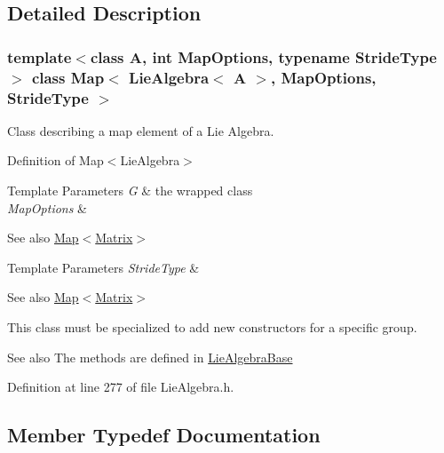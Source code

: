 \subsection{Detailed Description}
\subsubsection*{template$<$class A, int Map\+Options, typename Stride\+Type$>$\newline
class Map$<$ Lie\+Algebra$<$ A $>$, Map\+Options, Stride\+Type $>$}

Class describing a map element of a Lie Algebra. 

Definition of Map$<$\+Lie\+Algebra$>$


\begin{DoxyTemplParams}{Template Parameters}
{\em G} & the wrapped class \\
\hline
{\em Map\+Options} & \\
\hline
\end{DoxyTemplParams}
\begin{DoxySeeAlso}{See also}
\hyperlink{class_map_3_01_lie_algebra_3_01_a_01_4_00_01_map_options_00_01_stride_type_01_4_a5e320dd14d4d47929d7a4d48014a735f}{Map$<$\+Matrix$>$} 
\end{DoxySeeAlso}

\begin{DoxyTemplParams}{Template Parameters}
{\em Stride\+Type} & \\
\hline
\end{DoxyTemplParams}
\begin{DoxySeeAlso}{See also}
\hyperlink{class_map_3_01_lie_algebra_3_01_a_01_4_00_01_map_options_00_01_stride_type_01_4_a5e320dd14d4d47929d7a4d48014a735f}{Map$<$\+Matrix$>$}
\end{DoxySeeAlso}
This class must be specialized to add new constructors for a specific group.

\begin{DoxySeeAlso}{See also}
The methods are defined in \hyperlink{class_lie_algebra_base}{Lie\+Algebra\+Base} 
\end{DoxySeeAlso}


Definition at line 277 of file Lie\+Algebra.\+h.



\subsection{Member Typedef Documentation}
\hypertarget{class_map_3_01_lie_algebra_3_01_a_01_4_00_01_map_options_00_01_stride_type_01_4_a1f44b1c76739ca5f9a17c23109c32488}{}\label{class_map_3_01_lie_algebra_3_01_a_01_4_00_01_map_options_00_01_stride_type_01_4_a1f44b1c76739ca5f9a17c23109c32488} 

